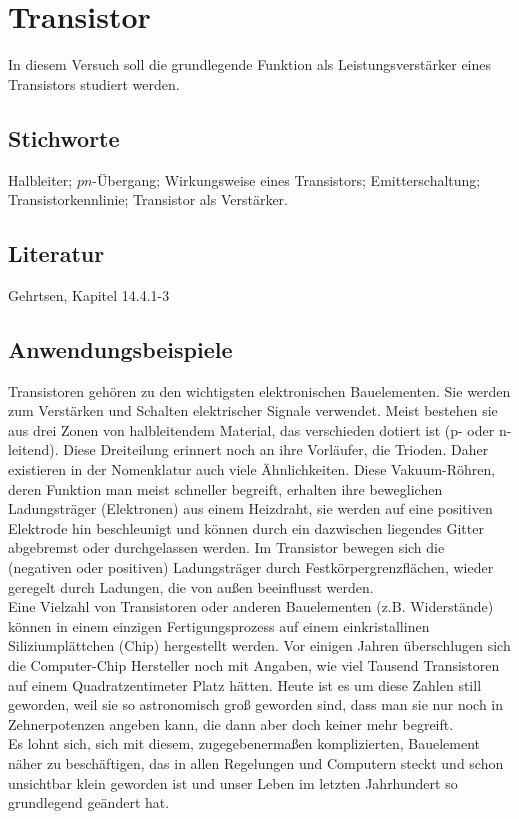 \chapter{Transistor}
\label{v:18}

In diesem Versuch soll die grundlegende Funktion als Leistungsverstärker eines Transistors studiert werden.

\section{Stichworte}

Halbleiter; $pn$-Übergang; Wirkungsweise eines Transistors; Emitterschaltung; Transistorkennlinie; Transistor als Verstärker.
%
\section{Literatur}

Gehrtsen, Kapitel 14.4.1-3
%
\section{Anwendungsbeispiele}

Transistoren gehören zu den wichtigsten elektronischen Bauelementen. Sie werden zum Verstärken und Schalten elektrischer Signale verwendet. Meist bestehen sie aus drei Zonen von halbleitendem Material, das verschieden dotiert ist (p- oder n-leitend). Diese Dreiteilung erinnert noch an ihre Vorläufer, die Trioden. Daher existieren in der Nomenklatur auch viele Ähnlichkeiten. Diese Vakuum-Röhren, deren Funktion man meist schneller begreift, erhalten ihre beweglichen Ladungsträger (Elektronen) aus einem Heizdraht, sie werden auf eine positiven Elektrode hin beschleunigt und können durch ein dazwischen liegendes Gitter abgebremst oder durchgelassen werden. Im Transistor bewegen sich die (negativen oder positiven) Ladungsträger durch Festkörpergrenzflächen, wieder geregelt durch Ladungen, die von außen beeinflusst werden.\\
Eine Vielzahl von Transistoren oder anderen Bauelementen (z.B. Widerstände) können in einem einzigen Fertigungsprozess auf einem einkristallinen Siliziumplättchen (Chip) hergestellt werden. Vor einigen Jahren überschlugen sich die Computer-Chip Hersteller noch mit Angaben, wie viel Tausend Transistoren auf einem Quadratzentimeter Platz hätten. Heute ist es um diese Zahlen still geworden, weil sie so astronomisch groß geworden sind, dass man sie nur noch in Zehnerpotenzen angeben kann, die dann aber doch keiner mehr begreift.\\
Es lohnt sich, sich mit diesem, zugegebenermaßen komplizierten, Bauelement näher zu beschäftigen, das in allen Regelungen und Computern steckt und schon unsichtbar klein geworden ist und unser Leben im letzten Jahrhundert so grundlegend geändert hat.

